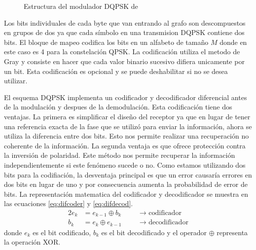 \begin{figure}[bp]
  \centering
  \vspace{0.5in}
  \vspace{0.3in}
  \caption{Estructura del modulador DQPSK de \gnuradio}
  \label{fig:dqpsk}
\end{figure}

Los bits individuales de cada byte que van entrando al grafo son descompuestos en grupos de dos ya
que cada s\'imbolo en una transmision DQPSK contiene dos bits. El bloque de mapeo codifica los bits
en un alfabeto de tama\~no $M$ donde en este caso es 4 para la constelaci\'on QPSK. La
codificaci\'on utiliza el metodo de Gray y consiste en hacer que cada valor binario sucesivo difiera
unicamente por un bit. Esta codificaci\'on es opcional y se puede deshabilitar si no se desea utilizar. 

El esquema DQPSK implementa un codificador y decodificador diferencial antes de la modulaci\'on y
despues de la demodulaci\'on. Esta codificaci\'on tiene dos ventajas. La primera es simplificar el
dise\~no del receptor ya que en lugar de tener una referencia exacta de la fase que se utiliz\'o
para enviar la informaci\'on, ahora se utiliza la diferencia entre dos bits. Esto nos
permite realizar una recuperaci\'on no coherente de la informaci\'on. La segunda ventaja es que
ofrece protecci\'on contra la inversi\'on de polaridad. Este m\'etodo nos permite recuperar la
informaci\'on independientemente si este fen\'omeno sucede o no. Como estamos utilizando dos bits
para la codifiaci\'on, la desventaja principal es que un error causar\'ia errores en dos bits en
lugar de uno y por consecuencia aumenta la probabilidad de error de bits. La representaci\'on
matematica del codificador y decodificador se muestra en las ecuaciones \ref{eq:difcoder} y
\ref{eq:difdecod}.
\begin{alignat}{2}
e_k &=e_{k-1}\oplus b_k &\quad &\rightarrow \text{ codificador}\label{eq:difcoder}\\
b_k &=e_k \oplus e_{k-1} &\quad &\rightarrow \text{ decodificador}\label{eq:difdecod}
\end{alignat}
donde $e_k$ es el bit codificado, $b_k$ es el bit decodificado y el operador $\oplus$ representa la
operaci\'on XOR.

